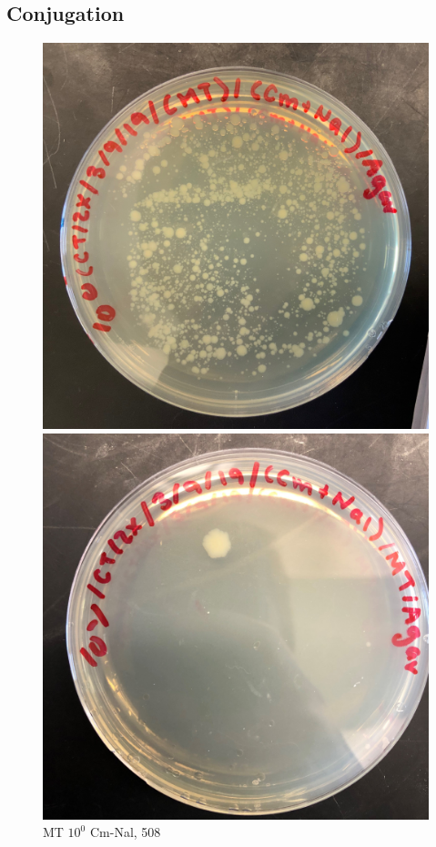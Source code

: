 \documentclass{article}
\begin{document}
		\subsection{Conjugation}
			\begin{figure}[H]
				\begin{minipage}[t]{0.24\textwidth}
					\centering
					\includegraphics[width = 0.9\linewidth]{Mate_0_NalCm.jpg}
					\caption{MT $10^{0}$ Cm-Nal, 508}
				\end{minipage}
				\begin{minipage}[t]{0.24\textwidth}
					\centering
					\includegraphics[width = 0.9\linewidth]{Mate_1_NalCm.jpg}

\end{minipage}
\end{figure}
\end{document}
